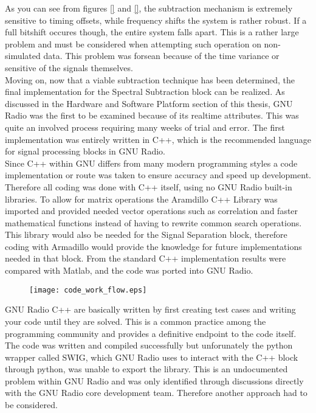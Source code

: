 As you can see from figures \ref{} and \ref{}, the subtraction mechanism is extremely sensitive to timing offsets, while frequency shifts the system is rather robust.  If a full bitshift occures though, the entire system falls apart.  This is a rather large problem and must be considered when attempting such operation on non-simulated data.  This problem was forsean because of the time variance or sensitive of the signals themselves. \\

Moving on, now that a viable subtraction technique has been determined, the final implementation for the Spectral Subtraction block can be realized.  As discussed in the Hardware and Software Platform section of this thesis, GNU Radio was the first to be examined because of its realtime attributes.  This was quite an involved process requiring many weeks of trial and error.  The first implementation was entirely written in C++, which is the recommended language for signal processing blocks in GNU Radio.\\  

Since C++ within GNU differs from many modern programming styles a code implementation or route was taken to ensure accuracy and speed up development.  Therefore all coding was done with C++ itself, using no GNU Radio built-in libraries\cite{gnuradioCPP}.  To allow for matrix operations the Aramdillo C++ Library\cite{armadillo} was imported and provided needed vector operations such as correlation and faster mathematical functions instead of having to rewrite common search operations.  This library would also be needed for the Signal Separation block, therefore coding with Armadillo would provide the knowledge for future implementations needed in that block.  From the standard C++ implementation results were compared with Matlab, and the code was ported into GNU Radio.\\

\begin{figure}
\texttt{[image: code\_work\_flow.eps]}
\end{figure}

GNU Radio C++ are basically written by first creating test cases and writing your code until they are solved.  This is a common practice among the programming community and provides a definitive endpoint to the code itself.  The code was written and compiled successfully but unforunately the python wrapper called SWIG\cite{swig}, which GNU Radio uses to interact with the C++ block through python, was unable to export the library.  This is an undocumented problem within GNU Radio and was only identified through discussions directly with the GNU Radio core development team.  Therefore another approach had to be considered.\\

